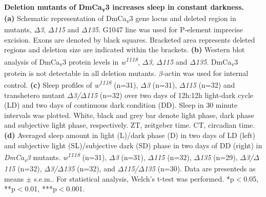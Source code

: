\label{fig:S2}
\textbf{Deletion mutants of DmCa\textsubscript{v}3 increases sleep in constant darkness.}
\\
\textbf{(a)} Schematic representation of DmCa\textsubscript{v}3 gene locus and deleted region in mutants, \emph{$\Delta$3}, \emph{$\Delta$115} and \emph{$\Delta$135}.
G1047 line was used for P-element imprecise excision.
Exons are denoted by black squares.
Bracketed area represents deleted regions and deletion size are indicated within the brackets.
\textbf{(b)} Western blot analysis of DmCa\textsubscript{v}3 protein levels in \emph{w\textsuperscript{1118}}, \emph{$\Delta$3}, \emph{$\Delta$115} and \emph{$\Delta$135}.
DmCa\textsubscript{v}3 protein is not detectable in all deletion mutants.
$\beta$-actin was used for internal control.
\textbf{(c)} Sleep profiles of \emph{w\textsuperscript{1118}} (n=31), \emph{$\Delta$3} (n=31), \emph{$\Delta$115} (n=32) and transhetero mutant \emph{$\Delta$3/$\Delta$115} (n=32) over two days of 12h:12h light-dark cycle (LD) and two days of continuous dark condition (DD).
Sleep in 30 minute intervals was plotted.
White, black and grey bar denote light phase, dark phase and subjective light phase, respectively.
ZT, zeitgeber time.
CT, circadian time.
\textbf{(d)} Averaged sleep amount in light (L)/dark phase (D) in two days of LD (left) and subjective light (SL)/subjective dark (SD) phase in two days of DD (right) in \emph{DmCa\textsubscript{v}3} mutants.
\emph{w\textsuperscript{1118}} (n=31), \emph{$\Delta$3} (n=31), \emph{$\Delta$115} (n=32), \emph{$\Delta$135} (n=29), \emph{$\Delta$3/$\Delta$115} (n=32), \emph{$\Delta$3/$\Delta$135} (n=32), and \emph{$\Delta$115/$\Delta$135} (n=30).
Data are presenteds as means $\pm$ s.e.m..
For statistical analysis, Welch's t-test was performed.
*p$<$0.05, **p$<$0.01, ***p$<$0.001.
  
  
  